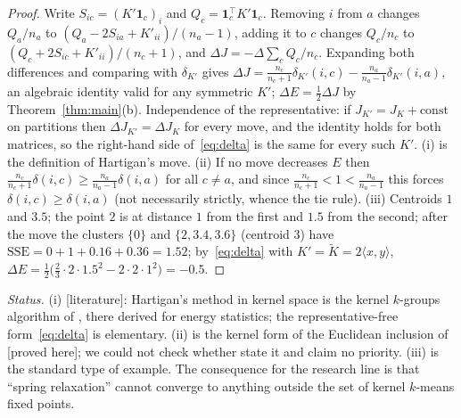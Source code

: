 \documentclass[11pt,a4paper]{article}
\theoremstyle{plain}
\theoremstyle{definition}
\theoremstyle{remark}
\newcommand{\SSE}{\mathrm{SSE}}
\newcommand{\one}{\mathbf 1}
\newcommand{\status}[1]{\textsf{\small [#1]}}
\begin{document}
\begin{proof}
Write $S_{ic}=(K'\one_c)_i$ and $Q_c=\one_c^{\!\top}K'\one_c$. Removing $i$ from $a$ changes $Q_a/n_a$ to $(Q_a-2S_{ia}+K'_{ii})/(n_a-1)$, adding it to $c$ changes $Q_c/n_c$ to $(Q_c+2S_{ic}+K'_{ii})/(n_c+1)$, and $\Delta J=-\Delta\sum_cQ_c/n_c$. Expanding both differences and comparing with $\delta_{K'}$ gives $\Delta J=\frac{n_c}{n_c+1}\delta_{K'}(i,c)-\frac{n_a}{n_a-1}\delta_{K'}(i,a)$, an algebraic identity valid for any symmetric $K'$; $\Delta E=\tfrac12\Delta J$ by Theorem~\ref{thm:main}(b). Independence of the representative: if $J_{K'}=J_K+\mathrm{const}$ on partitions then $\Delta J_{K'}=\Delta J_K$ for every move, and the identity holds for both matrices, so the right-hand side of~\eqref{eq:delta} is the same for every such $K'$. (i) is the definition of Hartigan's move. (ii) If no move decreases $E$ then $\frac{n_c}{n_c+1}\delta(i,c)\ge\frac{n_a}{n_a-1}\delta(i,a)$ for all $c\ne a$, and since $\frac{n_c}{n_c+1}<1<\frac{n_a}{n_a-1}$ this forces $\delta(i,c)\ge\delta(i,a)$ (not necessarily strictly, whence the tie rule). (iii) Centroids $1$ and $3.5$; the point $2$ is at distance $1$ from the first and $1.5$ from the second; after the move the clusters $\{0\}$ and $\{2,3.4,3.6\}$ (centroid $3$) have $\SSE=0+1+0.16+0.36=1.52$; by~\eqref{eq:delta} with $K'=\widetilde K=2\langle x,y\rangle$, $\Delta E=\tfrac12\bigl(\tfrac23\cdot2\cdot1.5^2-2\cdot2\cdot1^2\bigr)=-0.5$.
\end{proof}
\noindent \emph{Status.} (i) \status{literature}: Hartigan's method in kernel space is the kernel $k$-groups algorithm of \citet{franca2021}, there derived for energy statistics; the representative-free form~\eqref{eq:delta} is elementary. (ii) is the kernel form of the Euclidean inclusion of \citet{telgarsky2010} \status{proved here}; we could not check whether \citet{franca2021} state it and claim no priority. (iii) is the standard type of example. The consequence for the research line is that ``spring relaxation'' cannot converge to anything outside the set of kernel $k$-means fixed points.
\end{document}
